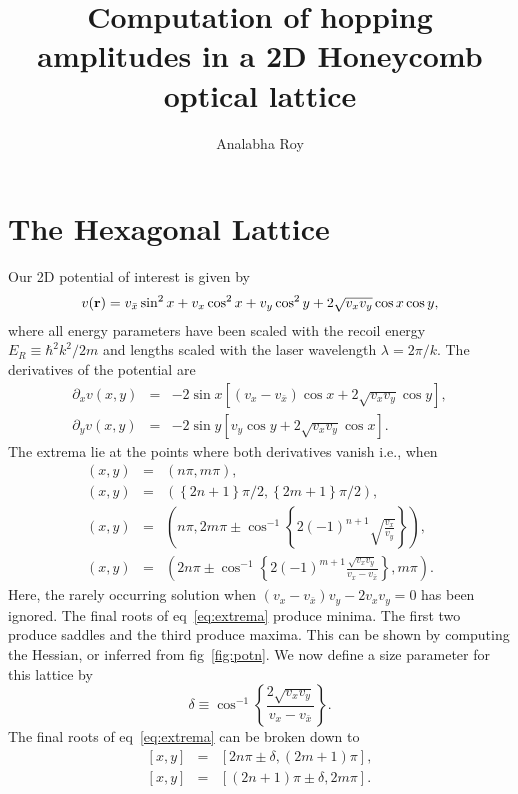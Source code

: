 \documentclass[a4paper,10pt]{article}
\title{Computation of hopping amplitudes in a 2D Honeycomb optical lattice}
\author{Analabha Roy}
\begin{document}
\maketitle

\section{The Hexagonal Lattice}
Our 2D potential of interest is given by~\cite{laetitia}
\begin{equation}
\label{eq:pot}
v({\bf r}) = v_{\bar{x}}\sin^2{x}  + v_x\cos^2{x} +  v_y\cos^2y + 
  2 \sqrt{v_x v_y}\cos{x}\cos{y},
\end{equation}
where all energy parameters have been scaled with the recoil energy $E_R\equiv \hbar^2 k^2/2m$ and lengths scaled with the 
laser wavelength $\lambda=2\pi/k$. The derivatives of the potential are
\begin{eqnarray}
\partial_x v(x,y) &=& -2\sin{x}\left[\left(v_x-v_{\bar{x}} \right) \cos{x} + 2\sqrt{v_xv_y}\cos{y}\right], \nonumber \\
\partial_y v(x,y) &=& -2\sin{y}\left[ v_y \cos{y} + 2\sqrt{v_xv_y}\cos{x}\right].
\end{eqnarray}
The extrema lie at the points where both derivatives vanish i.e., when
\begin{eqnarray}
\label{eq:extrema}
\left(x,y \right) &=& \left(n\pi,m\pi \right), \nonumber \\
\left(x,y \right) &=& \left(\left\{2n+1\right\}\pi/2,\left\{2m+1\right\}\pi/2 \right), \nonumber \\
\left(x,y \right) &=& \left(n\pi,2m\pi\pm\cos^{-1}\left\{2(-1)^{n+1}\sqrt{\frac{v_x}{v_y}}\right\} \right),\nonumber \\
 \left(x,y \right) &=& \left(2n\pi \pm \cos^{-1}\left\{2(-1)^{m+1}\frac{\sqrt{v_xv_y}}{v_x-v_{\bar{x}}} \right\},m\pi \right).
\end{eqnarray}
Here, the rarely occurring solution when $(v_x-v_{\bar{x}})v_y-2v_xv_y=0$ has been ignored. The final roots of eq~\ref{eq:extrema} produce minima. The first two produce saddles and the third produce maxima. This can be shown by computing the Hessian, or inferred from fig~\ref{fig:potn}. We now define a size parameter for this lattice by
\begin{equation}
\label{eq:d}
\delta\equiv\cos^{-1}\left\{\frac{2\sqrt{v_xv_y}}{v_x-v_{\bar{x}}}\right\}. 
\end{equation}
The final roots of eq~\ref{eq:extrema} can be broken down to
\begin{eqnarray}
\label{eq:minima}
 \left[x,y \right] &=& \left[2n\pi \pm \delta,\left(2m+1\right)\pi \right], \nonumber \\
\left[x,y \right] &=& \left[\left(2n+1\right)\pi \pm \delta,2m\pi \right].
\end{eqnarray}
\end{document}
